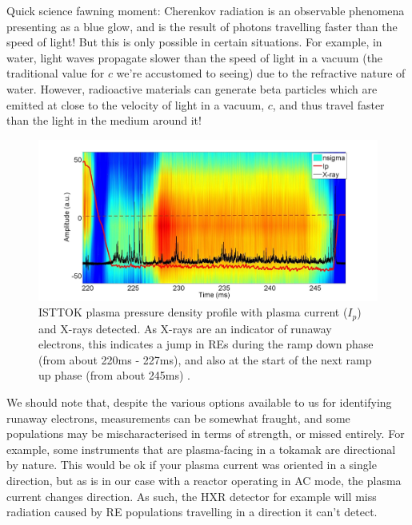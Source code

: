\begin{remark}
    Quick science fawning moment: Cherenkov radiation is an observable phenomena presenting as a blue 
    glow, and is the result of photons travelling faster than the speed of light! But this is only possible 
    in certain situations. For example, in water, light waves propagate slower than the speed of light in a vacuum
    (the traditional value for $c$ we're accustomed to seeing) due to the refractive nature of water.
    However, radioactive materials can generate beta particles which are emitted at close to the velocity of light 
    in a vacuum, $c$, and thus travel faster than the light in the medium around it! \cite{nobel-cherenkov}
\end{remark}

\begin{figure}[h!]
    \centering
    \includegraphics[scale=0.9]{imgs/c2/re-presence.png}
    \caption{ISTTOK plasma pressure density profile with plasma current ($I_p$) and X-rays detected. As X-rays are 
    an indicator of runaway electrons, this indicates a jump in REs during the ramp down phase (from about 
    220ms - 227ms), and also 
    at the start of the next ramp up phase (from about 245ms) \cite{malaquias-matthew}.}
\end{figure}

We should note that, despite the various options available to us for identifying runaway electrons, 
measurements can be somewhat fraught, and some populations may be mischaracterised in terms of strength, or 
missed entirely. For example, some instruments that are plasma-facing in a tokamak are directional by nature. This would 
be ok if your plasma current was oriented in a single direction, but as is in our case with a reactor operating 
in AC mode, the plasma current changes direction. As such, the HXR detector for example will miss radiation 
caused by RE populations travelling in a direction it can't detect. 
